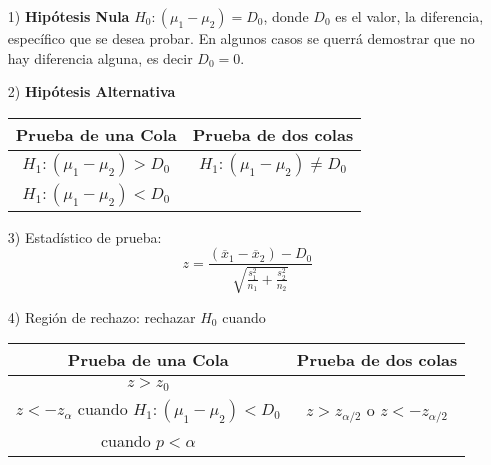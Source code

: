 \begin{itemize}
\item[1) ] \textbf{Hip\'otesis Nula} $H_{0}:\left(\mu_{1}-\mu_{2}\right)=D_{0}$,
donde $D_{0}$ es el valor, la diferencia, espec\'ifico que se desea probar. En algunos casos se querr\'a demostrar que no hay diferencia alguna, es decir $D_{0}=0$.

\item[2) ] \textbf{Hip\'otesis Alternativa}
\begin{tabular}{cc}\hline
\textbf{Prueba de una Cola} & \textbf{Prueba de dos colas}\\\hline
$H_{1}:\left(\mu_{1}-\mu_{2}\right)>D_{0}$ & $H_{1}:\left(\mu_{1}-\mu_{2}\right)\neq D_{0}$\\ 
$H_{1}:\left(\mu_{1}-\mu_{2}\right)<D_{0}$&\\
\end{tabular}

\item[3) ] Estad\'istico de prueba:
$$z=\frac{\left(\overline{x}_{1}-\overline{x}_{2}\right)-D_{0}}{\sqrt{\frac{s^{2}_{1}}{n_{1}}+\frac{s^{2}_{2}}{n_{2}}}}$$
\item[4) ] Regi\'on de rechazo: rechazar $H_{0}$ cuando
\begin{tabular}{cc}\hline
\textbf{Prueba de una Cola} & \textbf{Prueba de dos colas}\\\hline
$z>z_{0}$ & \\
$z<-z_{\alpha}$ cuando $H_{1}:\left(\mu_{1}-\mu_{2}\right)<D_{0}$&$z>z_{\alpha/2}$ o $z<-z_{\alpha/2}$\\
 cuando $p<\alpha$&\\
\end{tabular}
\end{itemize}


